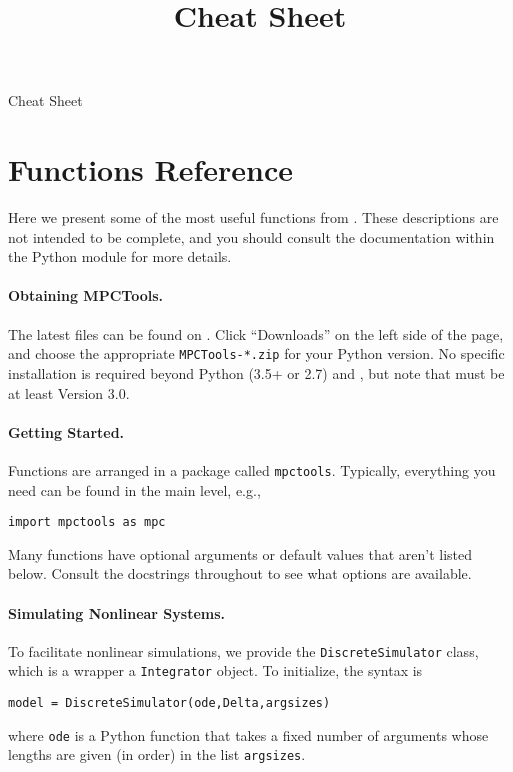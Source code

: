 \documentclass{article}
\title{\mpctools{} Cheat Sheet}
\begin{document}
\begin{center}
    \LARGE \mpctools{} Cheat Sheet
\end{center}

\section{Functions Reference}

Here we present some of the most useful functions from \mpctools{}.
These descriptions are not intended to be complete, and you should consult the documentation within the Python module for more details.

\begin{multicols}{2}

\paragraph*{Obtaining MPCTools.}

The latest files can be found on \bitbucket{}.
Click ``Downloads'' on the left side of the page, and choose the appropriate \texttt{MPCTools-*.zip} for your Python version.
No specific installation is required beyond Python (3.5+ or 2.7) and \casadi{}, but note that \casadi{} must be at least Version 3.0.

\paragraph*{Getting Started.}

Functions are arranged in a package called \texttt{mpctools}.
Typically, everything you need can be found in the main level, e.g.,
%
\begin{lstlisting}
import mpctools as mpc
\end{lstlisting}

Many functions have optional arguments or default values that aren't listed below.
Consult the docstrings throughout \mpctools{} to see what options are available.

\paragraph*{Simulating Nonlinear Systems.}

To facilitate nonlinear simulations, we provide the \texttt{DiscreteSimulator} class, which is a wrapper a \casadi{} \texttt{Integrator} object.
To initialize, the syntax is
%
\begin{lstlisting}
model = DiscreteSimulator(ode,Delta,argsizes)
\end{lstlisting}
%
where \texttt{ode} is a Python function that takes a fixed number of arguments whose lengths are given (in order) in the list \texttt{argsizes}.


\end{multicols}
\end{document}
